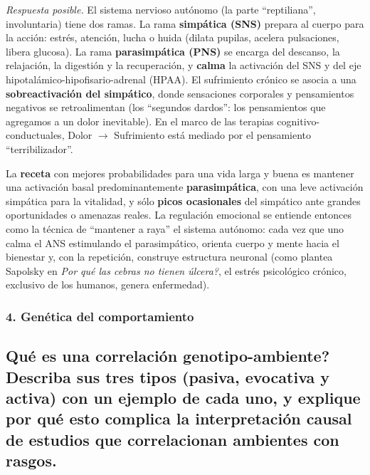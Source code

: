 \documentclass[11pt, a4paper]{article}
\newcommand{\pregunta}[1]{\subsection{#1}}
\newcommand{\eje}[1]{\subsubsection{#1}}
\begin{document}
\begin{respuesta}
\textit{Respuesta posible.} El sistema nervioso aut\'onomo (la parte ``reptiliana'', involuntaria) tiene dos ramas. La rama \textbf{simp\'atica (SNS)} prepara al cuerpo para la acci\'on: estr\'es, atenci\'on, lucha o huida (dilata pupilas, acelera pulsaciones, libera glucosa). La rama \textbf{parasimp\'atica (PNS)} se encarga del descanso, la relajaci\'on, la digesti\'on y la recuperaci\'on, y \textbf{calma} la activaci\'on del SNS y del eje hipotal\'amico-hipofisario-adrenal (HPAA). El sufrimiento cr\'onico se asocia a una \textbf{sobreactivaci\'on del simp\'atico}, donde sensaciones corporales y pensamientos negativos se retroalimentan (los ``segundos dardos'': los pensamientos que agregamos a un dolor inevitable). En el marco de las terapias cognitivo-conductuales, Dolor $\to$ Sufrimiento est\'a mediado por el pensamiento ``terribilizador''.

La \textbf{receta} con mejores probabilidades para una vida larga y buena es mantener una activaci\'on basal predominantemente \textbf{parasimp\'atica}, con una leve activaci\'on simp\'atica para la vitalidad, y s\'olo \textbf{picos ocasionales} del simp\'atico ante grandes oportunidades o amenazas reales. La regulaci\'on emocional se entiende entonces como la t\'ecnica de ``mantener a raya'' el sistema aut\'onomo: cada vez que uno calma el ANS estimulando el parasimp\'atico, orienta cuerpo y mente hacia el bienestar y, con la repetici\'on, construye estructura neuronal (como plantea Sapolsky en \textit{\textquestiondown Por qu\'e las cebras no tienen \'ulcera?}, el estr\'es psicol\'ogico cr\'onico, exclusivo de los humanos, genera enfermedad).
\end{respuesta}

\eje{4. Gen\'etica del comportamiento}
\pregunta{\textquestiondown Qu\'e es una \textbf{correlaci\'on genotipo-ambiente}? Describa sus tres tipos (pasiva, evocativa y activa) con un ejemplo de cada uno, y explique por qu\'e esto complica la interpretaci\'on causal de estudios que correlacionan ambientes con rasgos.}
\end{document}

